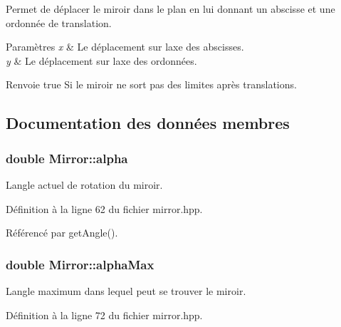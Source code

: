Permet de déplacer le miroir dans le plan en lui donnant un abscisse et une ordonnée de translation. 


\begin{DoxyParams}{Paramètres}
{\em x} & Le déplacement sur l\textquotesingle{}axe des abscisses. \\
\hline
{\em y} & Le déplacement sur l\textquotesingle{}axe des ordonnées.\\
\hline
\end{DoxyParams}
\begin{DoxyReturn}{Renvoie}
{\ttfamily true} Si le miroir ne sort pas des limites après translations. 
\end{DoxyReturn}


\subsection{Documentation des données membres}
\hypertarget{classMirror_a28ecd988b42db315b57fc8d9b23ebd86}{}
\subsubsection[{alpha}]{\setlength{\rightskip}{0pt plus 5cm}double Mirror\+::alpha\hspace{0.3cm}{\ttfamily [private]}}\label{classMirror_a28ecd988b42db315b57fc8d9b23ebd86}


L\textquotesingle{}angle actuel de rotation du miroir. 



Définition à la ligne 62 du fichier mirror.\+hpp.



Référencé par get\+Angle().

\hypertarget{classMirror_acc41ebc589e76d723bff02eea9ddfee3}{}
\subsubsection[{alpha\+Max}]{\setlength{\rightskip}{0pt plus 5cm}double Mirror\+::alpha\+Max\hspace{0.3cm}{\ttfamily [private]}}\label{classMirror_acc41ebc589e76d723bff02eea9ddfee3}


L\textquotesingle{}angle maximum dans lequel peut se trouver le miroir. 



Définition à la ligne 72 du fichier mirror.\+hpp.



